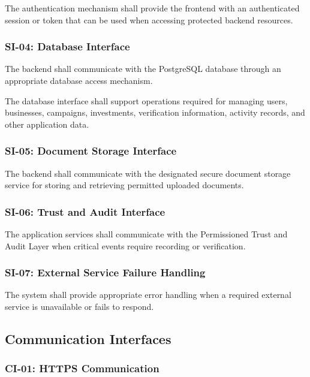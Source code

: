 The authentication mechanism shall provide the frontend with an
authenticated session or token that can be used when accessing protected
backend resources.

\subsubsection{SI-04: Database Interface}

The backend shall communicate with the PostgreSQL database through an
appropriate database access mechanism.

The database interface shall support operations required for managing
users, businesses, campaigns, investments, verification information,
activity records, and other application data.

\subsubsection{SI-05: Document Storage Interface}

The backend shall communicate with the designated secure document storage
service for storing and retrieving permitted uploaded documents.

\subsubsection{SI-06: Trust and Audit Interface}

The application services shall communicate with the Permissioned Trust and
Audit Layer when critical events require recording or verification.

\subsubsection{SI-07: External Service Failure Handling}

The system shall provide appropriate error handling when a required
external service is unavailable or fails to respond.



\subsection{Communication Interfaces}

\subsubsection{CI-01: HTTPS Communication}

